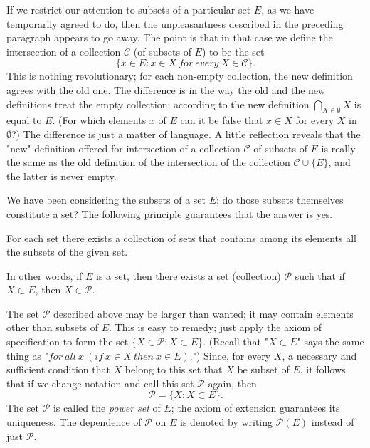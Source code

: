 If we restrict our attention to subsets of a particular set $E$, as we have temporarily agreed to do, then the unpleasantness described in the preceding paragraph appears to go away. The point is that in that case we define the intersection of a collection $ \mathcal{C} $ (of subsets of $E$) to be the set 
\begin{equation*}
\{ x \in E: x \in X \: for \: every \: X \in \mathcal{C} \}.
\end{equation*}
This is nothing revolutionary; for each non-empty collection, the new definition agrees with the old one. The difference is in the way the old and the new definitions treat the empty collection; according to the new definition  $\bigcap_{X \in \emptyset} X$ is equal to $E$. (For which elements $x$ of $E$ can it be false that $x \in X$ for every $X$ in $\emptyset $?) The difference is just a matter of language. A little reflection reveals that the "new" definition offered for intersection of a collection $ \mathcal{C} $ of subsets of $E$ is really the same as the old definition of the intersection of the collection $ \mathcal{C} \cup \{ E \} $, and the latter is never empty. 

We have been considering the subsets of a set $E$; do those subsets themselves constitute a set? The following principle guarantees that the answer is yes.

\begin{named}  For each set there exists a collection of sets that contains among its elements all the subsets of the given set. 
\end{named}

In other words, if $E$ is a set, then there exists a set (collection) $ \mathcal{P} $ such that if $X \subset E$, then $X \in \mathcal{P}$.
 
The set $ \mathcal{P} $ described above may be larger than wanted; it may contain elements other than subsets of $E$. This is easy to remedy; just apply the axiom of specification to form the set $ \{ X \in \mathcal{P}: X \subset E \} $. (Recall that "$ X \subset E $"  says the same thing as "$for \: all \: x \:(if \: x \in X \: then \: x \in E) $.") Since, for every $X$, a necessary and sufficient condition that $X$ belong to this set that $X$ be subset of $E$, it follows that if we change notation and call this set $ \mathcal{P} $ again, then 
\begin{equation*}
\mathcal{P} = \{ X : X \subset E \} .
\end{equation*}
The set $ \mathcal{P} $ is called the \textit{power set} of $E$; the axiom of extension guarantees its uniqueness. The dependence of $ \mathcal{P} $ on $E$ is denoted by writing $ \mathcal{P} (E) $ instead of just $ \mathcal{P} $.

